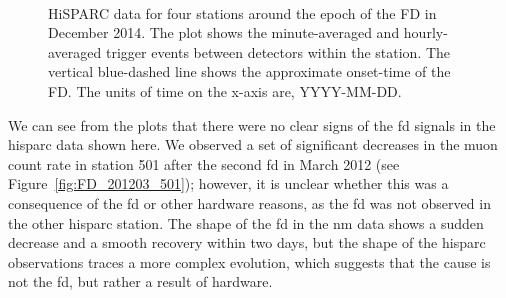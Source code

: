 \begin{figure}[ht!]
	\centering
	 \\
	
	\qquad
	
	
	\caption{HiSPARC data for four stations around the epoch of the FD in December 2014. The plot shows the minute-averaged and hourly-averaged trigger events between detectors within the station. The vertical blue-dashed line shows the approximate onset-time of the FD. The units of time on the x-axis are, YYYY-MM-DD.}
	\label{fig:FD_201412}
\end{figure}


We can see from the plots that there were no clear signs of the \gls{fd} signals in the \gls{hisparc} data shown here. We observed a set of significant decreases in the muon count rate in station 501 after the second \gls{fd} in March 2012 (see Figure~\ref{fig:FD_201203_501}); however, it is unclear whether this was a consequence of the \gls{fd} or other hardware reasons, as the \gls{fd} was not observed in the other \gls{hisparc} station. The shape of the \gls{fd} in the \gls{nm} data shows a sudden decrease and a smooth recovery within two days, but the shape of the \gls{hisparc} observations traces a more complex evolution, which suggests that the cause is not the \gls{fd}, but rather a result of hardware.

